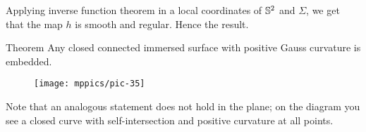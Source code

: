 Applying inverse function theorem in a local coordinates of $\mathbb{S}^2$ and $\Sigma$,
we get that the map $h$ is smooth and regular.
Hence the result.
\qeds


\begin{thm}{Theorem}
Any closed connected immersed surface with positive Gauss curvature is embedded.
\end{thm}

\begin{wrapfigure}[8]{r}{20 mm}
\vskip-4mm
\centering
\texttt{[image: mppics/pic-35]}
\vskip0mm
\end{wrapfigure}

Note that an analogous statement does not hold in the plane;
on the diagram you see a closed curve with self-intersection and positive curvature at all points.

